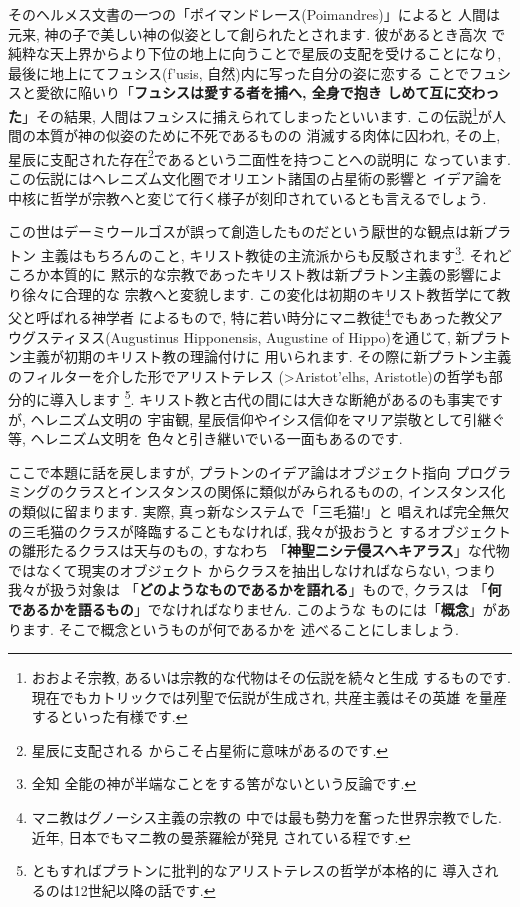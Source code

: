 \documentclass[b5j,8pt,twocolumn]{ltjsarticle}
\newcommand{\textgreek}[1]{\begingroup\fontencoding{LGR}\selectfont#1\endgroup}
\newcommand{\textgreek}[1]{\begingroup\fontencoding{LGR}\selectfont#1\endgroup}
\begin{document}
そのヘルメス文書の一つの「ポイマンドレース(Poimandres)」\cite{柴田}によると
人間は元来, 神の子で美しい神の似姿として創られたとされます. 彼があるとき高次
で純粋な天上界からより下位の地上に向うことで星辰の支配を受けることになり,
 最後に地上にてフュシス(\textgreek{f'usis}, 自然)内に写った自分の姿に恋する
ことでフュシスと愛欲に陥いり「\textbf{フュシスは愛する者を捕へ, 全身で抱き
しめて互に交わった}」その結果, 人間はフュシスに捕えられてしまったといいます.
 この伝説\footnote{おおよそ宗教, あるいは宗教的な代物はその伝説を続々と生成
するものです. 現在でもカトリックでは列聖で伝説が生成され, 共産主義はその英雄
を量産するといった有様です. }が人間の本質が神の似姿のために不死であるものの
消滅する肉体に囚われ, その上, 星辰に支配された存在\footnote{星辰に支配される
からこそ占星術に意味があるのです.}であるという二面性を持つことへの説明に
なっています. この伝説にはヘレニズム文化圏でオリエント諸国の占星術の影響と
イデア論を中核に哲学が宗教へと変じて行く様子が刻印されているとも言えるでしょう.
\newline

この世はデーミウールゴスが誤って創造したものだという厭世的な観点は新プラトン
主義はもちろんのこと, キリスト教徒の主流派からも反駁されます\footnote{全知
全能の神が半端なことをする筈がないという反論です.}. それどころか本質的に
黙示的な宗教であったキリスト教は新プラトン主義の影響により徐々に合理的な
宗教へと変貌します. この変化は初期のキリスト教哲学にて教父と呼ばれる神学者
によるもので, 特に若い時分にマニ教徒\footnote{マニ教はグノーシス主義の宗教の
中では最も勢力を奮った世界宗教でした. 近年, 日本でもマニ教の曼荼羅絵が発見
されている程です.}でもあった教父アウグスティヌス(Augustinus Hipponensis,
 Augustine of Hippo)を通じて, 新プラトン主義が初期のキリスト教の理論付けに
用いられます. その際に新プラトン主義のフィルターを介した形でアリストテレス
(\textgreek{>Aristot'elhs}, Aristotle)の哲学も部分的に導入します
\footnote{ともすればプラトンに批判的なアリストテレスの哲学が本格的に
導入されるのは12世紀以降の話です\cite{アリストテレス1}\cite{普遍論争}.}.
 キリスト教と古代の間には大きな断絶があるのも事実ですが, ヘレニズム文明の
宇宙観, 星辰信仰やイシス信仰をマリア崇敬として引継ぐ等, ヘレニズム文明を
色々と引き継いでいる一面もあるのです.
\newline

ここで本題に話を戻しますが, プラトンのイデア論はオブジェクト指向
プログラミングのクラスとインスタンスの関係に類似がみられるものの,
 インスタンス化の類似に留まります. 実際, 真っ新なシステムで「三毛猫!」と
唱えれば完全無欠の三毛猫のクラスが降臨することもなければ, 我々が扱おうと
するオブジェクトの雛形たるクラスは天与のもの, すなわち
「\textbf{神聖ニシテ侵スヘキアラス}」な代物ではなくて現実のオブジェクト
からクラスを抽出しなければならない, つまり我々が扱う対象は
「\textbf{どのようなものであるかを語れる}」もので, クラスは
「\textbf{何であるかを語るもの}」でなければなりません. このような
ものには「\textbf{概念}」があります. そこで概念というものが何であるかを
述べることにしましょう.
\end{document}
